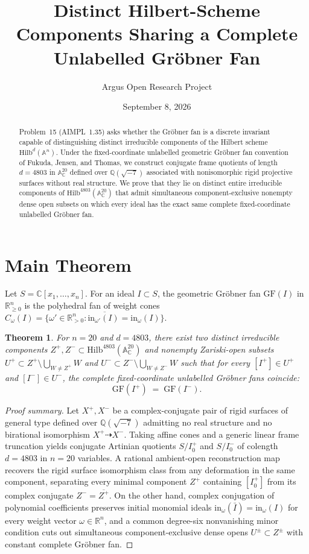 \documentclass[10pt,reqno]{amsart}
\title[Distinct Hilbert-Scheme Components Sharing an Unlabelled Gr\"obner Fan]
{Distinct Hilbert-Scheme Components Sharing a Complete Unlabelled Gr\"obner Fan}
\author{Argus Open Research Project}
\date{September 8, 2026}
\newtheorem{theorem}{Theorem}[section]
\theoremstyle{definition}
\begin{document}
\begin{abstract}
Problem~15 (AIMPL~1.35) asks whether the Gr\"obner fan is a discrete invariant capable of distinguishing distinct irreducible components of the Hilbert scheme $\mathrm{Hilb}^d(\mathbb{A}^n)$. Under the fixed-coordinate unlabelled geometric Gr\"obner fan convention of Fukuda, Jensen, and Thomas, we construct conjugate frame quotients of length $d=4803$ in $\mathbb{A}^{20}_{\mathbb{C}}$ defined over $\mathbb{Q}(\sqrt{-7})$ associated with nonisomorphic rigid projective surfaces without real structure. We prove that they lie on distinct entire irreducible components of $\mathrm{Hilb}^{4803}(\mathbb{A}^{20}_{\mathbb{C}})$ that admit simultaneous component-exclusive nonempty dense open subsets on which every ideal has the exact same complete fixed-coordinate unlabelled Gr\"obner fan.
\end{abstract}
\maketitle
\section{Main Theorem}
Let $S=\mathbb{C}[x_1,\dots,x_n]$. For an ideal $I\subset S$, the geometric Gr\"obner fan $\mathrm{GF}(I)$ in $\mathbb{R}_{\ge 0}^n$ is the polyhedral fan of weight cones $C_\omega(I)=\overline{\{\omega'\in\mathbb{R}_{>0}^n : \mathrm{in}_{\omega'}(I)=\mathrm{in}_\omega(I)\}}$.
\begin{theorem}
For $n=20$ and $d=4803$, there exist two distinct irreducible components $Z^+, Z^-\subset\mathrm{Hilb}^{4803}(\mathbb{A}^{20}_{\mathbb{C}})$ and nonempty Zariski-open subsets $U^+\subset Z^+\setminus\bigcup_{W\neq Z^+} W$ and $U^-\subset Z^-\setminus\bigcup_{W\neq Z^-} W$ such that for every $[I^+]\in U^+$ and $[I^-]\in U^-$, the complete fixed-coordinate unlabelled Gr\"obner fans coincide:
\[
  \mathrm{GF}(I^+) \;=\; \mathrm{GF}(I^-).
\]
\end{theorem}
\begin{proof}[Proof summary]
Let $X^+, X^-$ be a complex-conjugate pair of rigid surfaces of general type defined over $\mathbb{Q}(\sqrt{-7})$ admitting no real structure and no birational isomorphism $X^+\dashrightarrow X^-$. Taking affine cones and a generic linear frame truncation yields conjugate Artinian quotients $S/I_0^+$ and $S/I_0^-$ of colength $d=4803$ in $n=20$ variables. A rational ambient-open reconstruction map recovers the rigid surface isomorphism class from any deformation in the same component, separating every minimal component $Z^+$ containing $[I_0^+]$ from its complex conjugate $Z^-=\overline{Z^+}$. On the other hand, complex conjugation of polynomial coefficients preserves initial monomial ideals $\mathrm{in}_\omega(\bar{I})=\mathrm{in}_\omega(I)$ for every weight vector $\omega\in\mathbb{R}^n$, and a common degree-six nonvanishing minor condition cuts out simultaneous component-exclusive dense opens $U^\pm\subset Z^\pm$ with constant complete Gr\"obner fan.
\end{proof}
\end{document}
